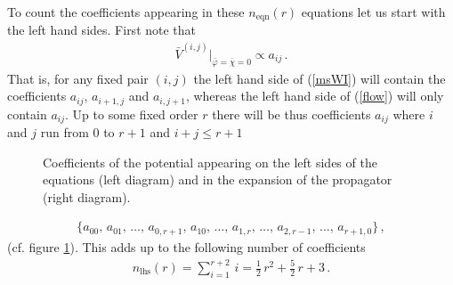 \documentclass[11pt]{book} %
\numberwithin{equation}{chapter}
\begin{document}
To count the coefficients appearing in these $n_{\text{eqn}}(r)$ equations let us start with the left hand sides.
First note that
\begin{align}
  \label{proportionality}
  \bar V^{(i,j)} \bigg|_{\bar\varphi = \bar\chi = 0}
  \propto a_{ij} \,.
\end{align}
That is, for any fixed pair $(i,j)$ the left hand side of (\ref{msWI}) will contain the coefficients
$a_{ij}$, $a_{i+1,j}$ and $a_{i,j+1}$, whereas the left hand side of (\ref{flow}) will only contain $a_{ij}$.
Up to some fixed order $r$ there will be thus coefficients $a_{ij}$ where $i$ and $j$ run from
$0$ to $r+1$ and $i+j \leqslant r+1$
\begin{figure}
  \begin{center}
    
    
  \end{center}
  \caption{
    Coefficients of the potential appearing on the left sides of the equations (left diagram)
    and in the expansion of the propagator (right diagram).
  }
  \label{fig:diag_lhs_rhs}
\end{figure}
\begin{align}
  \label{coeff_lhs}
  \bigg\lbrace
  a_{00},\, a_{01},\, \dots ,\, a_{0,r+1},\, a_{10},\, \dots ,\,
  a_{1,r},\, \dots ,\, a_{2,r-1},\, \dots,\, a_{r+1,0}
  \bigg\rbrace \,,
\end{align}
(cf. figure \ref{fig:diag_lhs_rhs}). This adds up to the following number of coefficients
\begin{align}
  n_{\text{lhs}}(r) = \sum_{i=1}^{r+2} \, i = \frac{1}{2} \, r^2 + \frac{5}{2} \, r + 3 \,.
\end{align}
\end{document}
